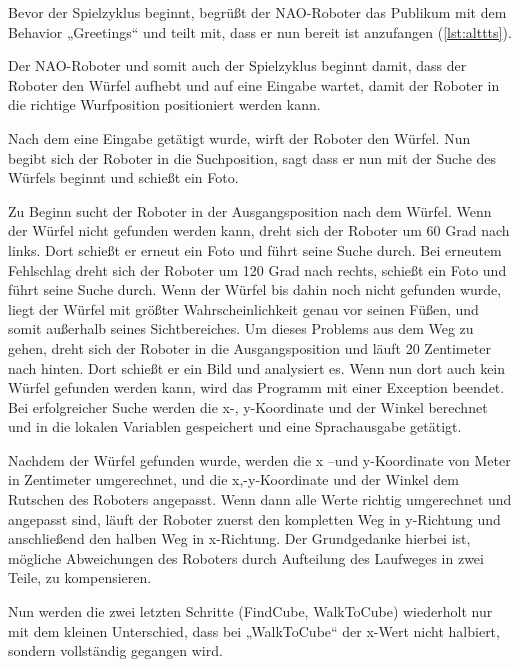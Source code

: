         Bevor der Spielzyklus beginnt, begrüßt der NAO-Roboter das Publikum mit
        dem Behavior „Greetings“ und teilt mit, dass er nun bereit ist
        anzufangen (\autoref{lst:alttts}).

        Der NAO-Roboter und somit auch der Spielzyklus beginnt damit, dass der
        Roboter den Würfel aufhebt und auf eine Eingabe wartet, damit der
        Roboter in die richtige Wurfposition positioniert werden kann.

        Nach dem eine Eingabe getätigt wurde, wirft der Roboter den Würfel.
        Nun begibt sich der Roboter in die Suchposition, sagt dass
        er nun mit der Suche des Würfels beginnt und schießt ein Foto.

        Zu Beginn sucht der Roboter in der Ausgangsposition nach dem Würfel.
        Wenn der Würfel nicht gefunden werden kann, dreht sich der Roboter um
        60 Grad nach links.
        Dort schießt er erneut ein Foto und führt seine Suche durch.
        Bei erneutem Fehlschlag dreht sich der Roboter um 120 Grad nach rechts,
        schießt ein Foto und führt seine Suche durch.
        Wenn der Würfel bis dahin noch nicht gefunden wurde, liegt der Würfel
        mit größter Wahrscheinlichkeit genau vor seinen Füßen, und somit
        außerhalb seines Sichtbereiches.
        Um dieses Problems aus dem Weg zu gehen, dreht sich der Roboter in die
        Ausgangsposition und läuft 20 Zentimeter nach hinten.
        Dort schießt er ein Bild und analysiert es.
        Wenn nun dort auch kein Würfel gefunden werden kann, wird das Programm
        mit einer Exception beendet.
        Bei erfolgreicher Suche werden die x-, y-Koordinate und der Winkel
        berechnet und in die lokalen Variablen gespeichert und eine
        Sprachausgabe getätigt.

        Nachdem der Würfel gefunden wurde, werden die x –und y-Koordinate von
        Meter in Zentimeter umgerechnet, und die x,-y-Koordinate und der Winkel
        dem Rutschen des Roboters angepasst.
        Wenn dann alle Werte richtig umgerechnet und angepasst sind, läuft der
        Roboter zuerst den kompletten Weg in y-Richtung und anschließend den
        halben Weg in x-Richtung.
        Der Grundgedanke hierbei ist, mögliche Abweichungen des Roboters durch
        Aufteilung des Laufweges in zwei Teile, zu kompensieren.

        Nun werden die zwei letzten Schritte (FindCube, WalkToCube) wiederholt
        nur mit dem kleinen Unterschied, dass bei „WalkToCube“ der x-Wert nicht
        halbiert, sondern vollständig gegangen wird.

